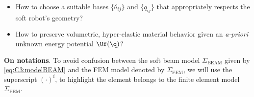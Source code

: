 %
\begin{itemize}
  \item How to choose a suitable bases $\{\theta_{ij}\}$ and $\{q_{ij}\}$ that appropriately respects the soft robot's geometry?
  \item How to preserve volumetric, hyper-elastic material behavior given an \textit{a-priori} unknown energy potential $\Uf(\q)$?
\end{itemize}
%

\textbf{On notations}. To avoid confusion between the soft beam model $\Sigma_{\textrm{BEAM}}$ given by \eqref{eq:C3:modelBEAM} and the FEM model denoted by $\Sigma_{\textrm{FEM}}$, we will use the superscript ${(\cdot)}^\textrm{f}$, to highlight the element belongs to the finite element model $\Sigma_{\textrm{FEM}}$.